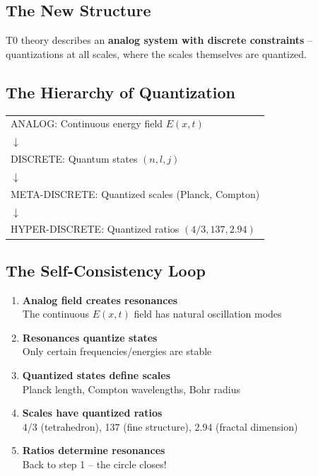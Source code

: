 	\subsection{The New Structure}
	
	T0 theory describes an \textbf{analog system with discrete constraints} -- quantizations at all scales, where the scales themselves are quantized.
	
	\subsection{The Hierarchy of Quantization}
	
	\begin{center}
		\begin{tabular}{l}
			ANALOG: Continuous energy field $E(x,t)$\\
			$\downarrow$\\
			DISCRETE: Quantum states $(n, l, j)$\\
			$\downarrow$\\
			META-DISCRETE: Quantized scales (Planck, Compton)\\
			$\downarrow$\\
			HYPER-DISCRETE: Quantized ratios $(4/3, 137, 2.94)$
		\end{tabular}
	\end{center}
	
	\subsection{The Self-Consistency Loop}
	
	\begin{enumerate}
		\item \textbf{Analog field creates resonances}\\
		The continuous $E(x,t)$ field has natural oscillation modes
		
		\item \textbf{Resonances quantize states}\\
		Only certain frequencies/energies are stable
		
		\item \textbf{Quantized states define scales}\\
		Planck length, Compton wavelengths, Bohr radius
		
		\item \textbf{Scales have quantized ratios}\\
		4/3 (tetrahedron), 137 (fine structure), 2.94 (fractal dimension)
		
		\item \textbf{Ratios determine resonances}\\
		Back to step 1 -- the circle closes!
	\end{enumerate}
	
